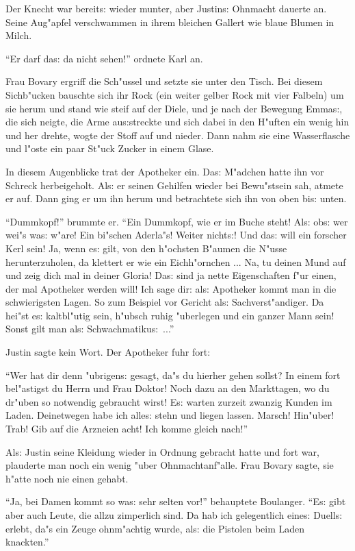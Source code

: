 \documentclass[oneside,12pt]{book}
\newcommand{\s}{s:}%
\begin{document}
Der Knecht war bereit{\s} wieder munter, aber Justin{\s} Ohnmacht
dauerte an. Seine Aug"apfel verschwammen in ihrem bleichen Gallert
wie blaue Blumen in Milch.

"`Er darf da{\s} da nicht sehen!"' ordnete Karl an.

Frau Bovary ergriff die Sch"ussel und setzte sie unter den Tisch.
Bei diesem Sichb"ucken bauschte sich ihr Rock (ein weiter gelber
Rock mit vier Falbeln) um sie herum und stand wie steif auf der
Diele, und je nach der Bewegung Emma{\s}, die sich neigte, die
Arme au{\s}streckte und sich dabei in den H"uften ein wenig hin
und her drehte, wogte der Stoff auf und nieder. Dann nahm sie eine
Wasserflasche und l"oste ein paar St"uck Zucker in einem Glase.

In diesem Augenblicke trat der Apotheker ein. Da{\s} M"adchen
hatte ihn vor Schreck herbeigeholt. Al{\s} er seinen Gehilfen
wieder bei Bewu"stsein sah, atmete er auf. Dann ging er um ihn
herum und betrachtete sich ihn von oben bi{\s} unten.

"`Dummkopf!"' brummte er. "`Ein Dummkopf, wie er im Buche steht!
Al{\s} ob{\s} wer wei"s wa{\s} w"are! Ein bi"schen Aderla"s!
Weiter nicht{\s}! Und da{\s} will ein forscher Kerl sein! Ja, wenn
e{\s} gilt, von den h"ochsten B"aumen die N"usse herunterzuholen,
da klettert er wie ein Eichh"ornchen ... Na, tu deinen Mund auf
und zeig dich mal in deiner Gloria! Da{\s} sind ja nette
Eigenschaften f"ur einen, der mal Apotheker werden will! Ich sage
dir: al{\s} Apotheker kommt man in die schwierigsten Lagen. So zum
Beispiel vor Gericht al{\s} Sachverst"andiger. Da hei"st e{\s}
kaltbl"utig sein, h"ubsch ruhig "uberlegen und ein ganzer Mann
sein! Sonst gilt man al{\s} Schwachmatiku{\s}~..."'

Justin sagte kein Wort. Der Apotheker fuhr fort:

"`Wer hat dir denn "ubrigen{\s} gesagt, da"s du hierher gehen
sollst? In einem fort bel"astigst du Herrn und Frau Doktor! Noch
dazu an den Markttagen, wo du dr"uben so notwendig gebraucht
wirst! E{\s} warten zurzeit zwanzig Kunden im Laden. Deinetwegen
habe ich alle{\s} stehn und liegen lassen. Marsch! Hin"uber! Trab!
Gib auf die Arzneien acht! Ich komme gleich nach!"'

Al{\s} Justin seine Kleidung wieder in Ordnung gebracht hatte und
fort war, plauderte man noch ein wenig "uber Ohnmachtanf"alle.
Frau Bovary sagte, sie h"atte noch nie einen gehabt.

"`Ja, bei Damen kommt so wa{\s} sehr selten vor!"' behauptete
Boulanger. "`E{\s} gibt aber auch Leute, die allzu zimperlich
sind. Da hab ich gelegentlich eine{\s} Duell{\s} erlebt, da"s ein
Zeuge ohnm"achtig wurde, al{\s} die Pistolen beim Laden
knackten."'
\end{document}
